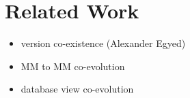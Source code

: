 \section{Related Work}
\label{sec:RW}

\begin{itemize}
    \item \metamodel version co-existence (Alexander Egyed)
    \item MM to MM co-evolution
    \item database view co-evolution
\end{itemize}
